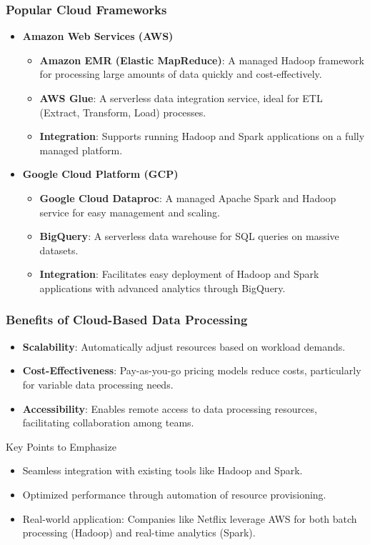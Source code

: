 \documentclass[aspectratio=169]{beamer}
\begin{document}
\begin{frame}[fragile]
    \frametitle{Popular Cloud Frameworks}
    \begin{itemize}
        \item \textbf{Amazon Web Services (AWS)}
            \begin{itemize}
                \item \textbf{Amazon EMR (Elastic MapReduce)}: A managed Hadoop framework for processing large amounts of data quickly and cost-effectively.
                \item \textbf{AWS Glue}: A serverless data integration service, ideal for ETL (Extract, Transform, Load) processes.
                \item \textbf{Integration}: Supports running Hadoop and Spark applications on a fully managed platform.
            \end{itemize}
        
        \item \textbf{Google Cloud Platform (GCP)}
            \begin{itemize}
                \item \textbf{Google Cloud Dataproc}: A managed Apache Spark and Hadoop service for easy management and scaling.
                \item \textbf{BigQuery}: A serverless data warehouse for SQL queries on massive datasets.
                \item \textbf{Integration}: Facilitates easy deployment of Hadoop and Spark applications with advanced analytics through BigQuery.
            \end{itemize}
    \end{itemize}
\end{frame}

\begin{frame}[fragile]
    \frametitle{Benefits of Cloud-Based Data Processing}
    \begin{itemize}
        \item \textbf{Scalability}: Automatically adjust resources based on workload demands.
        \item \textbf{Cost-Effectiveness}: Pay-as-you-go pricing models reduce costs, particularly for variable data processing needs.
        \item \textbf{Accessibility}: Enables remote access to data processing resources, facilitating collaboration among teams.
    \end{itemize}
    \begin{block}{Key Points to Emphasize}
        \begin{itemize}
            \item Seamless integration with existing tools like Hadoop and Spark.
            \item Optimized performance through automation of resource provisioning.
            \item Real-world application: Companies like Netflix leverage AWS for both batch processing (Hadoop) and real-time analytics (Spark).
        \end{itemize}
    \end{block}
\end{frame}
\end{document}
